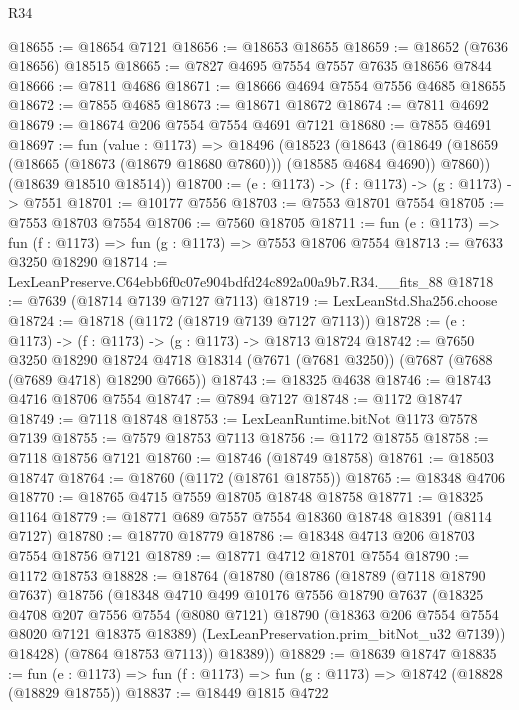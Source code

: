\begin{lexlean}{R34}
\begin{coremodule}
@18655 := @18654 @7121
@18656 := @18653 @18655
@18659 := @18652 (@7636 @18656) @18515
@18665 := @7827 @4695 @7554 @7557 @7635 @18656 @7844
@18666 := @7811 @4686
@18671 := @18666 @4694 @7554 @7556 @4685 @18655
@18672 := @7855 @4685
@18673 := @18671 @18672
@18674 := @7811 @4692
@18679 := @18674 @206 @7554 @7554 @4691 @7121
@18680 := @7855 @4691
@18697 := fun (value : @1173) =>
  @18496
    (@18523
      (@18643 (@18649 (@18659 (@18665 (@18673 (@18679 @18680 @7860))) (@18585 @4684 @4690)) @7860))
      (@18639 @18510 @18514))
@18700 := (e : @1173) -> (f : @1173) -> (g : @1173) -> @7551
@18701 := @10177 @7556
@18703 := @7553 @18701 @7554
@18705 := @7553 @18703 @7554
@18706 := @7560 @18705
@18711 := fun (e : @1173) => fun (f : @1173) => fun (g : @1173) => @7553 @18706 @7554
@18713 := @7633 @3250 @18290
@18714 := LexLeanPreserve.C64ebb6f0c07e904bdfd24c892a00a9b7.R34.__fits_88
@18718 := @7639 (@18714 @7139 @7127 @7113)
@18719 := LexLeanStd.Sha256.choose
@18724 := @18718 (@1172 (@18719 @7139 @7127 @7113))
@18728 := (e : @1173) -> (f : @1173) -> (g : @1173) -> @18713 @18724
@18742 := @7650
    @3250
    @18290
    @18724
    @4718
    @18314
    (@7671 (@7681 @3250))
    (@7687 (@7688 (@7689 @4718) @18290 @7665))
@18743 := @18325 @4638
@18746 := @18743 @4716 @18706 @7554
@18747 := @7894 @7127
@18748 := @1172 @18747
@18749 := @7118 @18748
@18753 := LexLeanRuntime.bitNot @1173 @7578 @7139
@18755 := @7579 @18753 @7113
@18756 := @1172 @18755
@18758 := @7118 @18756 @7121
@18760 := @18746 (@18749 @18758)
@18761 := @18503 @18747
@18764 := @18760 (@1172 (@18761 @18755))
@18765 := @18348 @4706
@18770 := @18765 @4715 @7559 @18705 @18748 @18758
@18771 := @18325 @1164
@18779 := @18771 @689 @7557 @7554 @18360 @18748 @18391 (@8114 @7127)
@18780 := @18770 @18779
@18786 := @18348 @4713 @206 @18703 @7554 @18756 @7121
@18789 := @18771 @4712 @18701 @7554
@18790 := @1172 @18753
@18828 := @18764
    (@18780
      (@18786
        (@18789
          (@7118 @18790 @7637)
          @18756
          (@18348
            @4710
            @499
            @10176
            @7556
            @18790
            @7637
            (@18325
              @4708
              @207
              @7556
              @7554
              (@8080 @7121)
              @18790
              (@18363 @206 @7554 @7554 @8020 @7121 @18375 @18389)
              (LexLeanPreservation.prim_bitNot_u32 @7139))
            @18428)
          (@7864 @18753 @7113))
        @18389))
@18829 := @18639 @18747
@18835 := fun (e : @1173) => fun (f : @1173) => fun (g : @1173) => @18742 (@18828 (@18829 @18755))
@18837 := @18449 @1815 @4722

\end{coremodule}
\end{lexlean}
